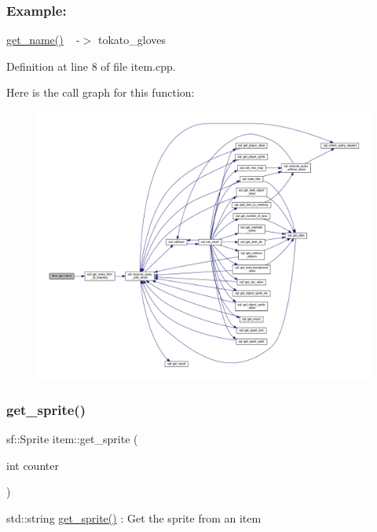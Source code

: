 \subsubsection*{Example\+: }

\hyperlink{classitem_ab7c2fa653e0f9a565283b60ca325f2a7}{get\+\_\+name()} ~\newline
-\/$>$ tokato\+\_\+gloves 

Definition at line 8 of file item.\+cpp.

Here is the call graph for this function\+:
\nopagebreak
\begin{figure}[H]
\begin{center}
\leavevmode
\includegraphics[width=350pt]{classitem_ab7c2fa653e0f9a565283b60ca325f2a7_cgraph}
\end{center}
\end{figure}
\mbox{\label{classitem_aafc61a4b7e2bd10300a6767e6dd7281e}} 
\subsubsection{\texorpdfstring{get\+\_\+sprite()}{get\_sprite()}}
{\footnotesize\ttfamily sf\+::\+Sprite item\+::get\+\_\+sprite (\begin{DoxyParamCaption}\item[{int}]{counter }\end{DoxyParamCaption})}



std\+::string \hyperlink{classitem_aafc61a4b7e2bd10300a6767e6dd7281e}{get\+\_\+sprite()} \+: Get the sprite from an item 

